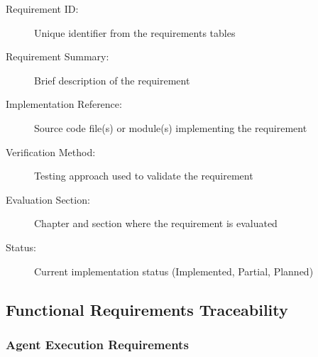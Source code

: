 \documentclass[a4paper,twoside]{sapthesis}
\begin{document}
\begin{description}
    \item[Requirement ID:] Unique identifier from the requirements tables
    \item[Requirement Summary:] Brief description of the requirement
    \item[Implementation Reference:] Source code file(s) or module(s) implementing the requirement
    \item[Verification Method:] Testing approach used to validate the requirement
    \item[Evaluation Section:] Chapter and section where the requirement is evaluated
    \item[Status:] Current implementation status (Implemented, Partial, Planned)
\end{description}

\subsection{Functional Requirements Traceability}
\label{subsec:fr-traceability}

\subsubsection{Agent Execution Requirements}
\end{document}
